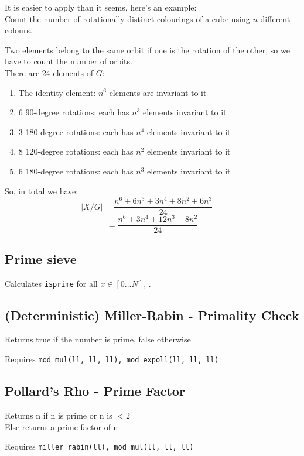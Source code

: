 It is easier to apply than it seems, here's an example: \\
Count the number of rotationally distinct colourings of a cube using $n$ different colours.

Two elements belong to the same orbit if one is the rotation of the other,
so we have to count the number of orbits. \\
There are 24 elements of $G$:

\begin{enumerate}
	\item The identity element: $n^6$ elements are invariant to it
	\item 6 90-degree rotations: each has $n^3$ elements invariant to it
	\item 3 180-degree rotations: each has $n^4$ elements invariant to it
	\item 8 120-degree rotations: each has $n^2$ elements invariant to it
	\item 6 180-degree rotations: each has $n^3$ elements invariant to it
\end{enumerate}

So, in total we have:
\[|X / G| = \frac{n^6 + 6n^3 + 3n^4 + 8n^2 + 6n^3}{24} = \]
\[= \frac{n^6 + 3n^4 + 12n^3 + 8n^2}{24}\]


\subsection{Prime sieve}
Calculates \verb|isprime| for all $x \in [0 \ldots N]$, .


\subsection{(Deterministic) Miller-Rabin - Primality Check}
Returns true if the number is prime, false otherwise

Requires \verb|mod_mul(ll, ll, ll), mod_expoll(ll, ll, ll)|



\subsection{Pollard's Rho - Prime Factor}
Returns n if n is prime or n is $< 2$ \\
Else returns a prime factor of n

Requires \verb|miller_rabin(ll), mod_mul(ll, ll, ll)|



